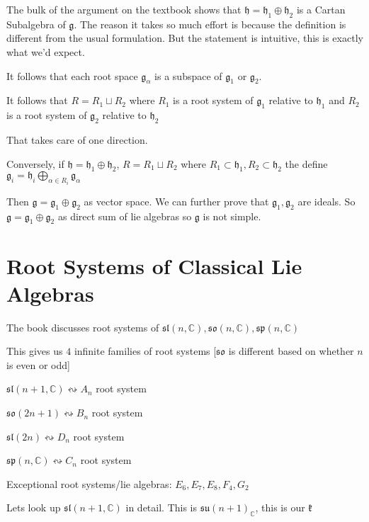 \documentclass{article}
\theoremstyle{definition}
\begin{document}
The bulk of the argument on the textbook shows that \(\mathfrak{h} = \mathfrak{h} _1 \oplus \mathfrak{h} _2\)  is a Cartan Subalgebra of \(\mathfrak{g} \). The reason it takes so much effort is because the definition is different from the usual formulation. But the statement is intuitive, this is exactly what we'd expect.

It follows that each root space \(\mathfrak{g}_\alpha \) is a subspace of \(\mathfrak{g}_1 \) or \(\mathfrak{g}_2 \).

It follows that \(R = R_1 \sqcup R_2\) where \(R_1\) is a root system of \(\mathfrak{g}_1 \) relative to \(\mathfrak{h}_1 \) and \(R_2\) is a root system of \(\mathfrak{g}_2 \) relative to \(\mathfrak{h}_2 \)   

That takes care of one direction.

Conversely, if \(\mathfrak{h} = \mathfrak{h}_1 \oplus \mathfrak{h}_2 \), \(R=R_1 \sqcup R_2\) where \(R_1 \subset \mathfrak{h}_1, R_2 \subset \mathfrak{h}_2  \)  the define \(\mathfrak{g}_i = \mathfrak{h}_i \bigoplus_{\alpha \in R_i}^{} \mathfrak{g} _\alpha  \) 

Then \(\mathfrak{g}=\mathfrak{g}_1 \oplus \mathfrak{g}_2   \) as vector space. We can further prove that \(\mathfrak{g}_1,\mathfrak{g}_2  \) are ideals. So \(\mathfrak{g}=\mathfrak{g}_1 \oplus \mathfrak{g}_2   \) as direct sum of lie algebras so \(\mathfrak{g} \) is not simple.

\section*{Root Systems of Classical Lie Algebras}

The book discusses root systems of \(\mathfrak{sl}(n,\mathbb{C}), \mathfrak{so}(n,\mathbb{C}), \mathfrak{sp}(n,\mathbb{C} )   \) 

This gives us \(4\) infinite families of root systems [\(\mathfrak{so} \) is different based on whether \(n\) is even or odd]

\(\mathfrak{sl}(n+1,\mathbb{C}) \leftrightsquigarrow A_n\) root system 

\(\mathfrak{so}(2n+1) \leftrightsquigarrow B_n\) root system

\(\mathfrak{sl}(2n) \leftrightsquigarrow D_n\) root system

\(\mathfrak{sp}(n,\mathbb{C}) \leftrightsquigarrow C_n\) root system

Exceptional root systems/lie algebras: \(E_6,E_7,E_8,F_4,G_2\) 

Lets look up \(\mathfrak{sl} (n+1,\mathbb{C} )\) in detail. This is \(\mathfrak{su} (n+1)_\mathbb{C}\), this is our \(\mathfrak{k} \)
\end{document}
